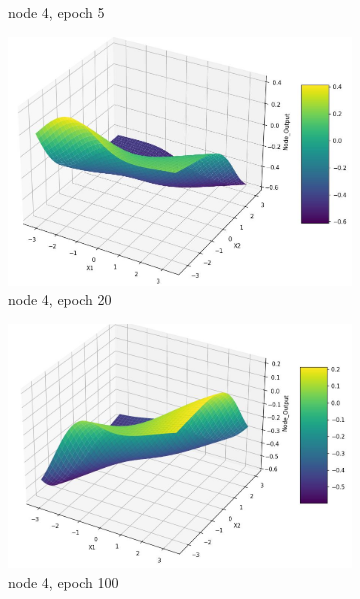 \documentclass[11pt]{article}
\begin{document}
\begin{figure}[h!]
\begin{subfigure}[b]{0.3\textwidth}
	\caption{node 4, epoch 5}
	\label{fig:fig2.1.7.2}
	\end{subfigure}
	\begin{subfigure}[b]{0.3\textwidth}
	\centering
	\includegraphics[scale=0.14]{hidden2_n4_e20.jpg}
	\caption{node 4, epoch 20}
	\label{fig:fig2.1.7.3}
	\end{subfigure}
	\begin{subfigure}[b]{0.45\textwidth}
	\centering
	\includegraphics[scale=0.14]{hidden2_n4_e100.jpg}
	\caption{node 4, epoch 100}
	\label{fig:fig2.1.7.4}
	\end{subfigure}
	\begin{subfigure}[b]{0.45\textwidth}
	\centering

\end{subfigure}
\end{figure}
\end{document}
